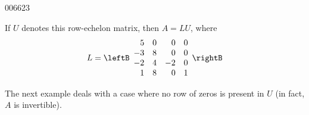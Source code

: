 \begin{example}{}{006623}
\begin{solution}
\vspace{-2em}
If $U$ denotes this row-echelon matrix, then $A = LU$, where
\begin{equation*} L =
\leftB \begin{array}{rrrrr}
5 & 0 & 0 & 0 \\
-3 & 8 & 0 & 0 \\
-2 & 4 & -2 & 0 \\
1 & 8 & 0 & 1
\end{array} \rightB
\end{equation*}
\end{solution}
\end{example}

\newpage

The next example deals with a case where no row of zeros is present in $U$ (in fact, $A$ is invertible).


